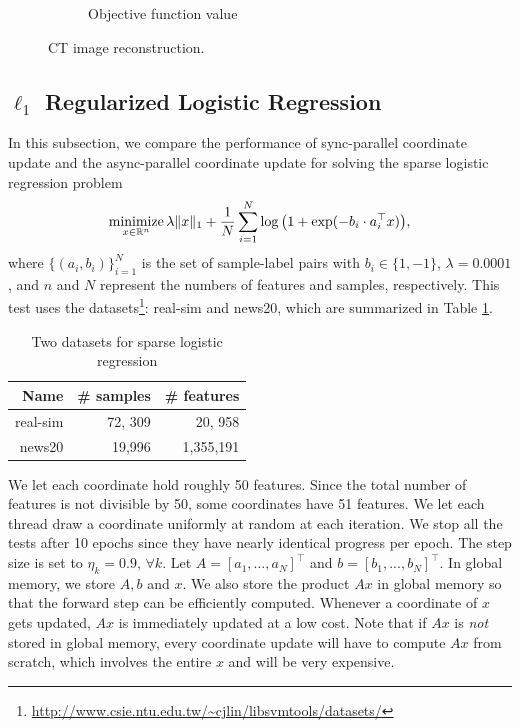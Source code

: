 \begin{figure}[!htb]
\begin{subfigure}{0.45\linewidth}
         \caption{Objective function value}\label{fig:pds_d}		                
        \label{fig:a}
    \end{subfigure} %
    \caption{CT image reconstruction.}
    \label{fig:pds_results}
\end{figure}


\subsection{$\ell_1$ Regularized Logistic Regression}
In this subsection, we compare the performance of sync-parallel coordinate update and the async-parallel coordinate update for solving the sparse logistic regression problem 
\begin{equation}\label{eqn:log}
\Min_{x \in \mathbb{R}^n} \lambda \|x\|_1 + \frac{1}{N} \sum_{i=1}^N \log\big(1 + \exp(-b_i \cdot a_i^{\top} x)\big),
\end{equation}
where $\{(a_i, b_i)\}_{i=1}^N$ is the set of sample-label pairs with $b_i \in \{1, -1\}$, $\lambda=0.0001$, and $n$ and $N$ represent the numbers of features and samples, respectively. This test uses the datasets\footnote{\url{http://www.csie.ntu.edu.tw/~cjlin/libsvmtools/datasets/}}: real-sim and news20, which are summarized in Table \ref{tab:log_data}.

\begin{table}[htbp]
\centering
 \caption{\label{tab:log_data}Two  datasets for  sparse logistic regression }
 \begin{tabular}{rrr}
\hline
  Name & \# samples & \# features \\
  \hline
 real-sim & 72, 309 & 20, 958 \\
  news20 & 19,996 & 1,355,191\\
  \hline
 \end{tabular}
\end{table}

We let each coordinate hold roughly 50 features. {Since the total number of features is not divisible by 50, some coordinates have 51 features.} We let each thread draw a coordinate uniformly at random at each iteration. We stop all the tests after 10 epochs since they have nearly identical progress per epoch. %
The step size is set to $\eta_k=0.9,\,\forall k$. Let $A = [a_1, \ldots, a_N]^{\top}$ and $b = [b_1, ..., b_N]^{\top}$. In global memory, we store $A, b$ and $x$. We also store the product $Ax$ in global memory so that the forward step can be efficiently computed. Whenever a coordinate of $x$ gets updated, $Ax$ is immediately updated at a low cost. Note that if $Ax$ is \emph{not} stored in global memory, every coordinate update will have to compute $Ax$ from scratch, which involves the entire $x$ and will be very expensive.  %

